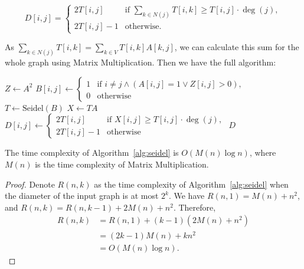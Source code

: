 \[ D[i,j] = \begin{cases}
		2T[i,j]   & \text{if } \sum_{k\in N(j)} T[i,k] \ge T[i,j]\cdot \deg(j), \\
		2T[i,j]-1 & \text{otherwise}.
	\end{cases} \]

As $\sum_{k\in N(j)} T[i,k] = \sum_{k\in V} T[i,k]A[k,j]$, we can calculate this sum for the whole graph using Matrix Multiplication. Then we have the full algorithm:

\begin{algorithm}[H]
	\caption{Seidel's Algorithm for APSP}\label{alg:seidel}
	$Z \gets A^2$\;
	$B[i,j]\gets \begin{cases}
			1 & \text{if } i \neq j \land (A[i,j] = 1 \lor Z[i,j] > 0), \\
			0 & \text{otherwise}
		\end{cases}$\;
	$T \gets \text{Seidel}(B)$\;
	$X \gets TA$\;
	$D[i,j] \gets \begin{cases}
			2T[i,j]   & \text{if } X[i,j] \ge T[i,j]\cdot \deg(j), \\
			2T[i,j]-1 & \text{otherwise}
		\end{cases}$\;
	\Return $D$\;
\end{algorithm}

\begin{theorem}
	The time complexity of Algorithm~\ref{alg:seidel} is $O(M(n)\log n)$, where $M(n)$ is the time complexity of Matrix Multiplication.
\end{theorem}

\begin{proof}
	Denote $R(n,k)$ as the time complexity of Algorithm~\ref{alg:seidel} when the diameter of the input graph is at most $2^k$. We have $R(n,1) = M(n)+n^2$, and $R(n,k) = R(n,k-1)+2M(n)+n^2$. Therefore,
	\begin{align*}
		R(n,k) & = R(n,1) + (k-1)(2M(n)+n^2) \\
		       & = (2k-1)M(n) + kn^2         \\
		       & = O(M(n)\log n).
	\end{align*}
\end{proof}
